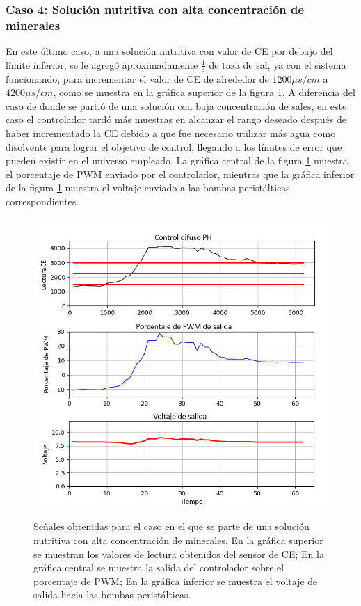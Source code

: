 \subsubsection{Caso 4: Solución nutritiva con alta concentración de minerales}

En este último caso, a una solución nutritiva con valor de CE por debajo del límite inferior, se le agregó aproximadamente $\frac{1}{4}$ de taza de sal, ya con el sistema funcionando, para incrementar el valor de CE de alrededor de $1200 \mu s/cm$ a $4200 \mu s/cm$, como se muestra en la gráfica superior de la figura \ref{CEMas}. A diferencia del caso de donde se partió de una solución con baja concentración de sales, en este caso el controlador tardó más muestras en alcanzar el rango deseado después de haber incrementado la CE debido a que fue necesario utilizar más agua como disolvente para lograr el objetivo de control, llegando a los límites de error que pueden existir en el universo empleado. La gráfica central de la figura \ref{CEMas} muestra el porcentaje de PWM enviado por el controlador, mientras que la gráfica inferior de la figura \ref{CEMas} muestra el voltaje enviado a las bombas peristálticas correspondientes.

\begin{figure}[H]
\centering
         \includegraphics[scale=0.75]{imgs/CEMas.png} \\
    \caption{Señales obtenidas para el caso en el que se parte de una solución nutritiva con alta concentración de minerales. En la gráfica superior se muestran los valores de lectura obtenidos del sensor de CE; En la gráfica central se muestra la salida del controlador sobre el porcentaje de PWM; En la gráfica inferior se muestra el voltaje de salida hacia las bombas peristálticas.}\label{CEMas}
\end{figure}

